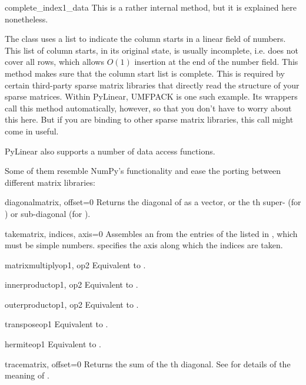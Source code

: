 \begin{methoddesc}[SparseExecuteMatrix]{complete_index1_data}{}
  This is a rather internal method, but it is explained here
  nonetheless.

  The  class uses a list to indicate the
  column starts in a linear field of numbers. This list of column
  starts, in its original state, is usually incomplete, i.e. does not
  cover all rows, which allows $O(1)$ insertion at the end of the
  number field. This method makes sure that the column start list is
  complete. This is required by certain third-party sparse matrix
  libraries that directly read the structure of your sparse
  matrices. Within PyLinear, UMFPACK is one such example. Its wrappers
  call this method automatically, however, so that you don't have to
  worry about this here. But if you are binding to other sparse matrix
  libraries, this call might come in useful.
\end{methoddesc}

PyLinear also supports a number of data access functions.

Some of them resemble NumPy's functionality and ease the porting between
different matrix libraries:

\begin{funcdesc}{diagonal}{matrix, offset=0}
  Returns the diagonal of  as a vector, or the th
  super- (for ) or sub-diagonal (for ).
\end{funcdesc}
\begin{funcdesc}{take}{matrix, indices, axis=0}
  Assembles an  from the entries of the 
  listed in , which must be simple numbers. 
  specifies the axis along which the indices are taken.
\end{funcdesc}
\begin{funcdesc}{matrixmultiply}{op1, op2}
  Equivalent to .
\end{funcdesc}
\begin{funcdesc}{innerproduct}{op1, op2}
  Equivalent to .
\end{funcdesc}
\begin{funcdesc}{outerproduct}{op1, op2}
  Equivalent to .
\end{funcdesc}
\begin{funcdesc}{transpose}{op1}
  Equivalent to .
\end{funcdesc}
\begin{funcdesc}{hermite}{op1}
  Equivalent to .
\end{funcdesc}
\begin{funcdesc}{trace}{matrix, offset=0}
  Returns the sum of the th diagonal. See 
  for details of the meaning of .
\end{funcdesc}
